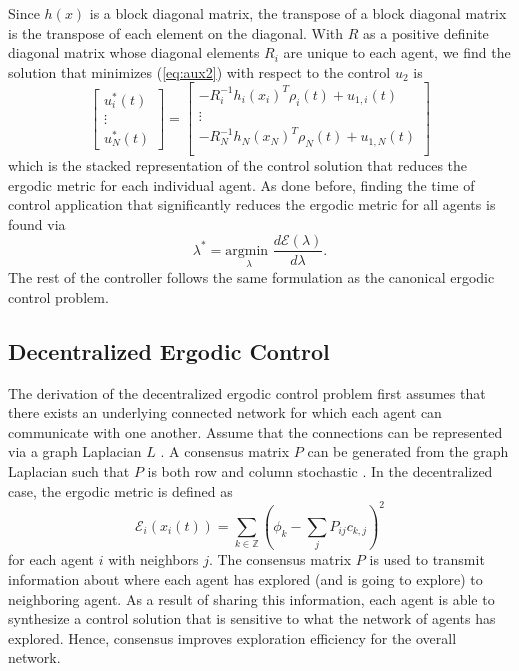 \documentclass[letterpaper, 10 pt,  conference, twoside]{IEEEtran/IEEEtran}
\theoremstyle{definition}
\begin{document}
Since $h(x)$ is a block diagonal matrix, the transpose of a block diagonal matrix is the transpose of each element on the diagonal. With $R$ as a positive definite diagonal matrix whose diagonal elements $R_i$ are unique to each agent, we find the solution that minimizes (\ref{eq:aux2}) with respect to the control $u_2$ is
\begin{equation} \label{eq:central}
\begin{bmatrix}
u^*_i (t) \\
\vdots \\
u^*_N(t)
\end{bmatrix}
=
\begin{bmatrix}
-R_i^{-1} h_i(x_i)^T \rho_i(t) + u_{1,i}(t) \\
\vdots \\
-R_N^{-1} h_N(x_N)^T \rho_N(t) + u_{1,N}(t) \\
\end{bmatrix}
\end{equation}
which is the stacked representation of the control solution that reduces the ergodic metric for each individual agent. As done before, finding the time of control application that significantly reduces the ergodic metric for all agents is found via
\begin{equation*}
\lambda ^*= \underset{\lambda}{\text{argmin }} \frac{d\mathcal{E} (\lambda)}{d\lambda} .
\end{equation*}
The rest of the controller follows the same formulation as the canonical ergodic control problem.
\subsection{Decentralized Ergodic Control}

The derivation of the decentralized ergodic control problem first assumes that there exists an underlying connected network for which each agent can communicate with one another. Assume that the connections can be represented via a graph Laplacian $L$ \cite{deo2016graph}. A consensus matrix $P$ can be generated from the graph Laplacian such that $P$ is both row and column stochastic \cite{deo2016graph, bertsekas1989parallel}. In the decentralized case, the ergodic metric is defined as
 \begin{equation} \label{eq:derg}
\mathcal{E}_i(x_i(t)) = \sum_{k \in \mathbb{Z}} (\phi_k - \sum_j P_{ij} c_{k,j})^2
 \end{equation}
for each agent $i$ with neighbors $j$. The consensus matrix $P$ is used to transmit information about where each agent has explored (and is going to explore) to neighboring agent. As a result of sharing this information, each agent is able to synthesize a control solution that is sensitive to what the network of agents has explored. Hence, consensus improves exploration efficiency for the overall network.
\end{document}
